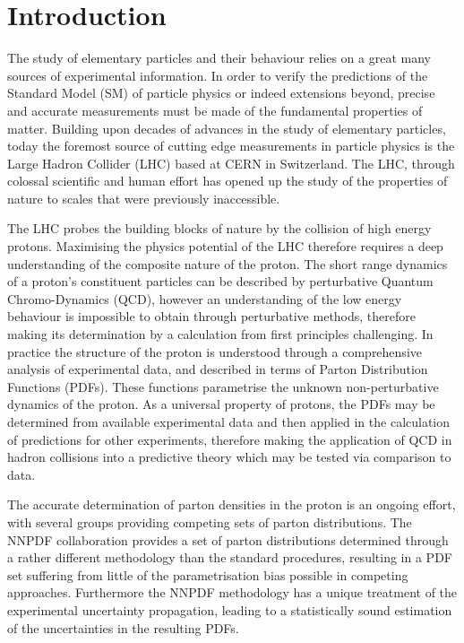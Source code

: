 \chapter*{Introduction}
\label{ch:intro}

The study of elementary particles and their behaviour relies on a great many
sources of experimental information.  In order to verify the predictions of the
Standard Model (SM) of particle physics or indeed extensions beyond, precise
and accurate measurements must be made of the fundamental properties of matter.
Building upon decades of advances in the study of elementary particles, today
the foremost source of cutting edge measurements in particle physics is the
Large Hadron Collider (LHC) based at CERN in Switzerland.  The LHC, through
colossal scientific and human effort has opened up the study of the properties
of nature to scales that were previously inaccessible. 

The LHC probes the building blocks of nature by the collision of high energy
protons. Maximising the physics potential of the LHC therefore requires a deep
understanding of the composite nature of the proton. The short range dynamics
of a proton's constituent particles can be described by perturbative Quantum
Chromo-Dynamics (QCD), however an understanding of the low energy behaviour is
impossible to obtain through perturbative methods, therefore making its
determination by a calculation from first principles challenging. In practice
the structure of the proton is understood through a comprehensive analysis of
experimental data, and described in terms of Parton Distribution Functions
(PDFs). These functions parametrise the unknown non-perturbative dynamics of
the proton. As a universal property of protons, the PDFs may be determined from
available experimental data and then applied in the calculation of predictions
for other experiments, therefore making the application of QCD in hadron
collisions into a predictive theory which may be tested via comparison to
data.

The accurate determination of parton densities in the proton is an ongoing
effort, with several groups providing competing sets of parton distributions.
The NNPDF collaboration provides a set of parton distributions determined
through a rather different methodology than the standard procedures, resulting
in a PDF set suffering from little of the parametrisation bias possible in
competing approaches. Furthermore the NNPDF methodology has a unique treatment
of the experimental uncertainty propagation, leading to a statistically sound
estimation of the uncertainties in the resulting PDFs.

